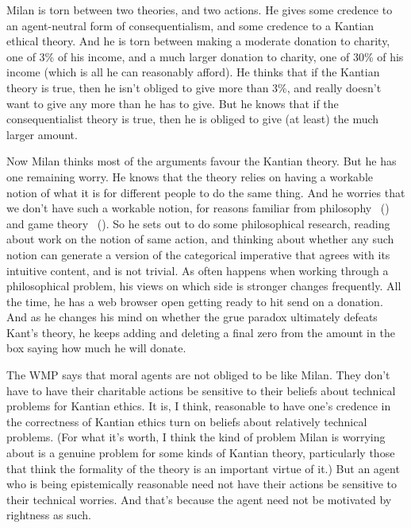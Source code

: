 \documentclass[
  10pt,
  letterpaper,
  twoside]{scrbook}
\begin{document}
{Milan} is torn between two theories, and two actions. He gives some
credence to an agent-neutral form of consequentialism, and some credence
to a Kantian ethical theory. And he is torn between making a moderate
donation to charity, one of 3\% of his income, and a much larger
donation to charity, one of 30\% of his income (which is all he can
reasonably afford). He thinks that if the Kantian theory is true, then
he isn't obliged to give more than 3\%, and really doesn't want to give
any more than he has to give. But he knows that if the consequentialist
theory is true, then he is obliged to give (at least) the much larger
amount.

Now {Milan} thinks most of the arguments favour the Kantian theory. But
he has one remaining worry. He knows that the theory relies on having a
workable notion of what it is for different people to do the same thing.
And he worries that we don't have such a workable notion, for reasons
familiar from philosophy ~() and
game theory ~(). So he
sets out to do some philosophical research, reading about work on the
notion of same action, and thinking about whether any such notion can
generate a version of the categorical imperative that agrees with its
intuitive content, and is not trivial. As often happens when working
through a philosophical problem, his views on which side is stronger
changes frequently. All the time, he has a web browser open getting
ready to hit send on a donation. And as he changes his mind on whether
the grue paradox ultimately defeats Kant's theory, he keeps adding and
deleting a final zero from the amount in the box saying how much he will
donate.

The WMP says that moral agents are not obliged to be like {Milan}. They
don't have to have their charitable actions be sensitive to their
beliefs about technical problems for Kantian ethics. It is, I think,
reasonable to have one's credence in the correctness of Kantian ethics
turn on beliefs about relatively technical problems. (For what it's
worth, I think the kind of problem Milan is worrying about is a genuine
problem for some kinds of Kantian theory, particularly those that think
the formality of the theory is an important virtue of it.) But an agent
who is being epistemically reasonable need not have their actions be
sensitive to their technical worries. And that's because the agent need
not be motivated by rightness as such.
\end{document}
